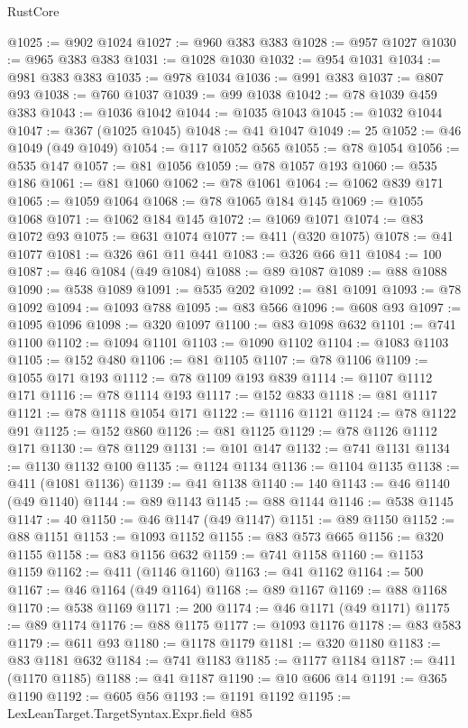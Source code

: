 \begin{lexlean}{RustCore}
\begin{coremodule}
@1025 := @902 @1024
@1027 := @960 @383 @383
@1028 := @957 @1027
@1030 := @965 @383 @383
@1031 := @1028 @1030
@1032 := @954 @1031
@1034 := @981 @383 @383
@1035 := @978 @1034
@1036 := @991 @383
@1037 := @807 @93
@1038 := @760 @1037
@1039 := @99 @1038
@1042 := @78 @1039 @459 @383
@1043 := @1036 @1042
@1044 := @1035 @1043
@1045 := @1032 @1044
@1047 := @367 (@1025 @1045)
@1048 := @41 @1047
@1049 := 25
@1052 := @46 @1049 (@49 @1049)
@1054 := @117 @1052 @565
@1055 := @78 @1054
@1056 := @535 @147
@1057 := @81 @1056
@1059 := @78 @1057 @193
@1060 := @535 @186
@1061 := @81 @1060
@1062 := @78 @1061
@1064 := @1062 @839 @171
@1065 := @1059 @1064
@1068 := @78 @1065 @184 @145
@1069 := @1055 @1068
@1071 := @1062 @184 @145
@1072 := @1069 @1071
@1074 := @83 @1072 @93
@1075 := @631 @1074
@1077 := @411 (@320 @1075)
@1078 := @41 @1077
@1081 := @326 @61 @11 @441
@1083 := @326 @66 @11
@1084 := 100
@1087 := @46 @1084 (@49 @1084)
@1088 := @89 @1087
@1089 := @88 @1088
@1090 := @538 @1089
@1091 := @535 @202
@1092 := @81 @1091
@1093 := @78 @1092
@1094 := @1093 @788
@1095 := @83 @566
@1096 := @608 @93
@1097 := @1095 @1096
@1098 := @320 @1097
@1100 := @83 @1098 @632
@1101 := @741 @1100
@1102 := @1094 @1101
@1103 := @1090 @1102
@1104 := @1083 @1103
@1105 := @152 @480
@1106 := @81 @1105
@1107 := @78 @1106
@1109 := @1055 @171 @193
@1112 := @78 @1109 @193 @839
@1114 := @1107 @1112 @171
@1116 := @78 @1114 @193
@1117 := @152 @833
@1118 := @81 @1117
@1121 := @78 @1118 @1054 @171
@1122 := @1116 @1121
@1124 := @78 @1122 @91
@1125 := @152 @860
@1126 := @81 @1125
@1129 := @78 @1126 @1112 @171
@1130 := @78 @1129
@1131 := @101 @147
@1132 := @741 @1131
@1134 := @1130 @1132 @100
@1135 := @1124 @1134
@1136 := @1104 @1135
@1138 := @411 (@1081 @1136)
@1139 := @41 @1138
@1140 := 140
@1143 := @46 @1140 (@49 @1140)
@1144 := @89 @1143
@1145 := @88 @1144
@1146 := @538 @1145
@1147 := 40
@1150 := @46 @1147 (@49 @1147)
@1151 := @89 @1150
@1152 := @88 @1151
@1153 := @1093 @1152
@1155 := @83 @573 @665
@1156 := @320 @1155
@1158 := @83 @1156 @632
@1159 := @741 @1158
@1160 := @1153 @1159
@1162 := @411 (@1146 @1160)
@1163 := @41 @1162
@1164 := 500
@1167 := @46 @1164 (@49 @1164)
@1168 := @89 @1167
@1169 := @88 @1168
@1170 := @538 @1169
@1171 := 200
@1174 := @46 @1171 (@49 @1171)
@1175 := @89 @1174
@1176 := @88 @1175
@1177 := @1093 @1176
@1178 := @83 @583
@1179 := @611 @93
@1180 := @1178 @1179
@1181 := @320 @1180
@1183 := @83 @1181 @632
@1184 := @741 @1183
@1185 := @1177 @1184
@1187 := @411 (@1170 @1185)
@1188 := @41 @1187
@1190 := @10 @606 @14
@1191 := @365 @1190
@1192 := @605 @56
@1193 := @1191 @1192
@1195 := LexLeanTarget.TargetSyntax.Expr.field @85

\end{coremodule}
\end{lexlean}

